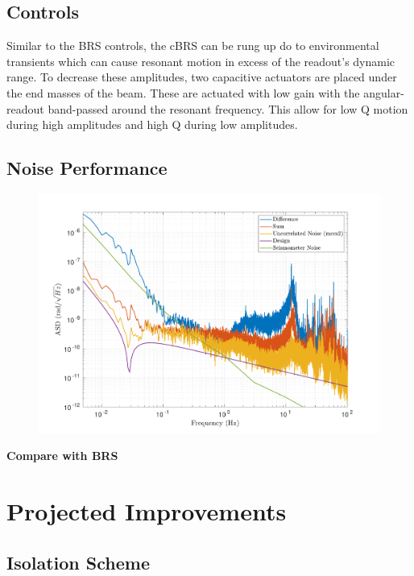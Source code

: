 \documentclass [12pt, proquest]{uwthesis}[2019]
\begin{document}
\subsection{Controls}

Similar to the BRS controls, the cBRS can be rung up do to environmental transients which can cause resonant motion in excess of the readout's dynamic range. To decrease these amplitudes, two capacitive actuators are placed under the end masses of the beam. These are actuated with low gain with the angular-readout band-passed around the resonant frequency. This allow for low Q motion during high amplitudes and high Q during low amplitudes.

\subsection{Noise Performance}

\begin{figure}
\begin{center}
 \includegraphics[width=\textwidth]{cBRS_Noise.pdf}
\caption{}
\label{cBRS_noise}
\end{center}
\end{figure}

\textbf{Compare with BRS}

\section{Projected Improvements}
\subsection{Isolation Scheme} \label{IsoScheme}
\end{document}
